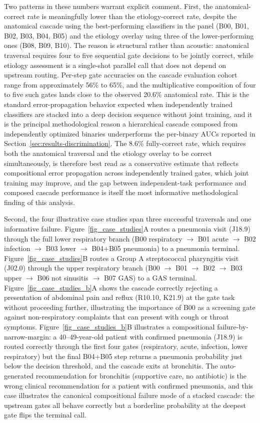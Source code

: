 \documentclass[utf8]{FrontiersinHarvard} %
\begin{document}
Two patterns in these numbers warrant explicit comment. First, the anatomical-correct rate is meaningfully lower than the etiology-correct rate, despite the anatomical cascade using the best-performing classifiers in the panel (B00, B01, B02, B03, B04, B05) and the etiology overlay using three of the lower-performing ones (B08, B09, B10). The reason is structural rather than acoustic: anatomical traversal requires four to five sequential gate decisions to be jointly correct, while etiology assessment is a single-shot parallel call that does not depend on upstream routing. Per-step gate accuracies on the cascade evaluation cohort range from approximately 56\% to 65\%, and the multiplicative composition of four to five such gates lands close to the observed 20.6\% anatomical rate. This is the standard error-propagation behavior expected when independently trained classifiers are stacked into a deep decision sequence without joint training, and it is the principal methodological reason a hierarchical cascade composed from independently optimized binaries underperforms the per-binary AUCs reported in Section~\ref{sec:results-discrimination}. The 8.6\% fully-correct rate, which requires both the anatomical traversal and the etiology overlay to be correct simultaneously, is therefore best read as a conservative estimate that reflects compositional error propagation across independently trained gates, which joint training may improve, and the gap between independent-task performance and composed cascade performance is itself the most informative methodological finding of this analysis.

Second, the four illustrative case studies span three successful traversals and one informative failure. Figure~\ref{fig_case_studies}A routes a pneumonia visit (J18.9) through the full lower respiratory branch (B00 respiratory $\to$ B01 acute $\to$ B02 infection $\to$ B03 lower $\to$ B04+B05 pneumonia) to a pneumonia terminal. Figure~\ref{fig_case_studies}B routes a Group A streptococcal pharyngitis visit (J02.0) through the upper respiratory branch (B00 $\to$ B01 $\to$ B02 $\to$ B03 upper $\to$ B06 not sinusitis $\to$ B07 GAS) to a GAS terminal. Figure~\ref{fig_case_studies_b}A shows the cascade correctly rejecting a presentation of abdominal pain and reflux (R10.10, K21.9) at the gate task without proceeding further, illustrating the importance of B00 as a screening gate against non-respiratory complaints that can present with cough or throat symptoms. Figure~\ref{fig_case_studies_b}B illustrates a compositional failure-by-narrow-margin: a 40--49-year-old patient with confirmed pneumonia (J18.9) is routed correctly through the first four gates (respiratory, acute, infection, lower respiratory) but the final B04+B05 step returns a pneumonia probability just below the decision threshold, and the cascade exits at bronchitis. The auto-generated recommendation for bronchitis (supportive care, no antibiotic) is the wrong clinical recommendation for a patient with confirmed pneumonia, and this case illustrates the canonical compositional failure mode of a stacked cascade: the upstream gates all behave correctly but a borderline probability at the deepest gate flips the terminal call.
\end{document}

